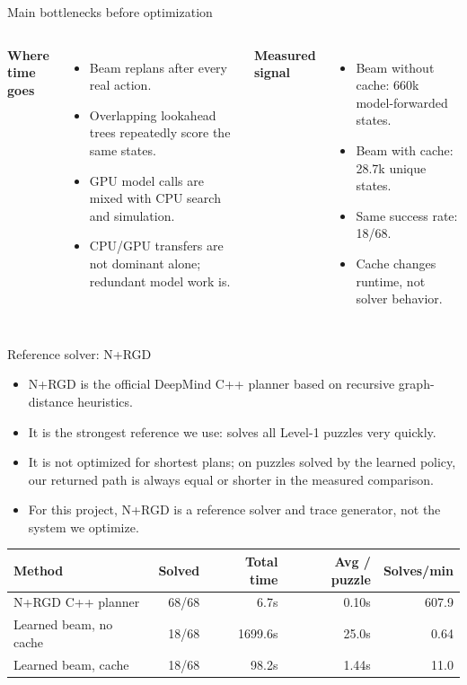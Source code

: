 \documentclass[aspectratio=169]{beamer}
\begin{document}
\begin{frame}{Main bottlenecks before optimization}
  \small
  \begin{columns}[T]
    \textbf{Where time goes}
    \begin{itemize}
      \item Beam replans after every real action.
      \item Overlapping lookahead trees repeatedly score the same states.
      \item GPU model calls are mixed with CPU search and simulation.
      \item CPU/GPU transfers are not dominant alone; redundant model work is.
    \end{itemize}

    \textbf{Measured signal}
    \begin{itemize}
      \item Beam without cache: 660k model-forwarded states.
      \item Beam with cache: 28.7k unique states.
      \item Same success rate: 18/68.
      \item Cache changes runtime, not solver behavior.
    \end{itemize}
  \end{columns}
\end{frame}

\begin{frame}{Reference solver: N+RGD}
  \small
  \begin{itemize}
    \item N+RGD is the official DeepMind C++ planner based on recursive graph-distance heuristics.
    \item It is the strongest reference we use: solves all Level-1 puzzles very quickly.
    \item It is not optimized for shortest plans; on puzzles solved by the learned policy, our returned path is always equal or shorter in the measured comparison.
    \item For this project, N+RGD is a reference solver and trace generator, not the system we optimize.
  \end{itemize}

  \vspace{0.7em}
  \centering
  \begin{tabular}{@{}lrrrr@{}}
    \toprule
    Method & Solved & Total time & Avg / puzzle & Solves/min \\
    \midrule
    N+RGD C++ planner & 68/68 & 6.7s & 0.10s & 607.9 \\
    Learned beam, no cache & 18/68 & 1699.6s & 25.0s & 0.64 \\
    Learned beam, cache & 18/68 & 98.2s & 1.44s & 11.0 \\
    \bottomrule
  \end{tabular}
\end{frame}
\end{document}
